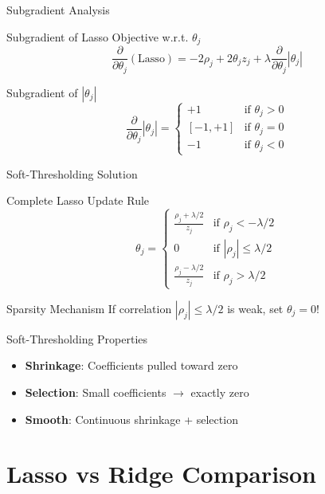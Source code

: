 \documentclass{beamer}
\begin{document}
\begin{frame}{Subgradient Analysis}
\begin{codebox}{Subgradient of Lasso Objective w.r.t. $\theta_j$}
$$\frac{\partial}{\partial \theta_{j}}(\text{Lasso}) = -2\rho_{j} + 2\theta_{j}z_{j} + \lambda \frac{\partial}{\partial \theta_{j}}|\theta_{j}|$$
\end{codebox}
\pause

\begin{theorembox}{Subgradient of $|\theta_j|$}
$$\frac{\partial}{\partial \theta_{j}}|\theta_{j}| = \begin{cases}
+1 & \text{if } \theta_{j} > 0 \\
[-1,+1] & \text{if } \theta_{j} = 0 \\
-1 & \text{if } \theta_{j} < 0
\end{cases}$$
\end{theorembox}
\end{frame}

\begin{frame}{Soft-Thresholding Solution}
\begin{theorembox}{Complete Lasso Update Rule}
$$\theta_{j} = \begin{cases}
\frac{\rho_{j} + \lambda/2}{z_{j}} & \text{if } \rho_{j} < -\lambda/2 \\
0 & \text{if } |\rho_{j}| \leq \lambda/2 \\
\frac{\rho_{j} - \lambda/2}{z_{j}} & \text{if } \rho_{j} > \lambda/2
\end{cases}$$
\end{theorembox}

\begin{alertbox}{Sparsity Mechanism}
If correlation $|\rho_j| \leq \lambda/2$ is weak, set $\theta_j = 0$!
\end{alertbox}

\begin{keypointsbox}{Soft-Thresholding Properties}
{\small
\begin{itemize}
\item \textbf{Shrinkage}: Coefficients pulled toward zero
\item \textbf{Selection}: Small coefficients $\rightarrow$ exactly zero
\item \textbf{Smooth}: Continuous shrinkage + selection
\end{itemize}
}
\end{keypointsbox}
\end{frame}

\section{Lasso vs Ridge Comparison}
\end{document}
